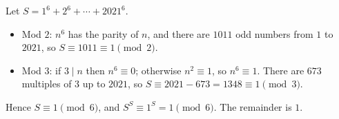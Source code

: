 Let $S=1^6+2^6+\cdots+2021^6$.
\begin{itemize}
\item Mod $2$: $n^6$ has the parity of $n$, and there are $1011$ odd numbers from $1$ to $2021$, so $S\equiv1011\equiv1\pmod2$.
\item Mod $3$: if $3\mid n$ then $n^6\equiv0$; otherwise $n^2\equiv1$, so $n^6\equiv1$. There are $673$ multiples of $3$ up to $2021$, so $S\equiv2021-673=1348\equiv1\pmod3$.
\end{itemize}
Hence $S\equiv1\pmod6$, and $S^S\equiv1^S=1\pmod6$. The remainder is $\boxed{1}$.
